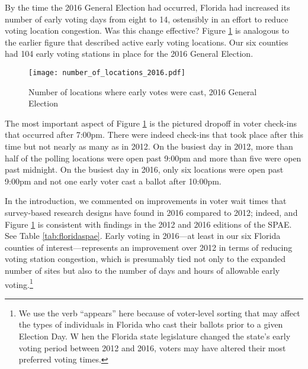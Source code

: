 \documentclass[12pt,titlepage]{article}
\begin{document}
By the time the 2016 General Election had occurred, Florida had
increased its number of early voting days from eight to 14, ostensibly
in an effort to reduce voting location congestion. Was this change
effective?  Figure \ref{fig:nrlocs2016} is analogous to the earlier
figure that described active early voting locations. Our six counties
had 104 early voting stations in place for the 2016 General Election.


\begin{figure}[!ht]
  \caption{Number of locations where early votes were cast, 2016 General
    Election}
  \label{fig:nrlocs2016}
  \centering
    \centering\texttt{[image: number\_of\_locations\_2016.pdf]}
\end{figure}

The most important aspect of Figure \ref{fig:nrlocs2016} is the
pictured dropoff in voter check-ins that occurred after 7:00pm.  There
were indeed check-ins that took place after this time but not nearly
as many as in 2012.  On the busiest day in 2012, more than half of the
polling locations were open past 9:00pm and more than five were open
past midnight.  On the busiest day in 2016, only six locations were
open past 9:00pm and not one early voter cast a ballot after 10:00pm.

In the introduction, we commented on improvements in voter wait times
that survey-based research designs have found in 2016 compared to
2012; indeed, and Figure \ref{fig:nrlocs2016} is consistent with
findings in the 2012 \citep{spae2012} and 2016 \citep{spae2016}
editions of the SPAE.  See Table \ref{tab:floridaspae}.  Early voting
in 2016---at least in our six Florida counties of
interest---represents an improvement over 2012 in terms of reducing
voting station congestion, which is presumably tied not only to the
expanded number of sites but also to the number of days and hours of
allowable early voting.\footnote{We use the verb ``appears'' here
  because of voter-level sorting that may affect the types of
  individuals in Florida who cast their ballots prior to a given
  Election Day.  W hen the Florida state legislature changed the
  state's early voting period between 2012 and 2016, voters may have
  altered their most preferred voting times.}
\end{document}
